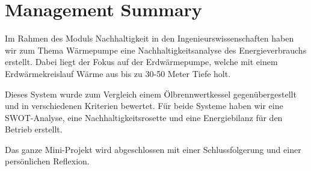 \chapter*{Management Summary}
\label{chap:managementSummary}

Im Rahmen des Moduls \glqq Nachhaltigkeit in den Ingenieurswissenschaften\grqq{} haben wir zum Thema Wärmepumpe eine Nachhaltigkeitsanalyse des Energieverbrauchs erstellt. Dabei liegt der Fokus auf der Erdwärmepumpe, welche mit einem Erdwärmekreislauf Wärme aus bis zu 30-50 Meter Tiefe holt.

Dieses System wurde zum Vergleich einem Ölbrennwertkessel gegenübergestellt und in verschiedenen Kriterien bewertet. Für beide Systeme haben wir eine SWOT-Analyse, eine Nachhaltigkeitsrosette und eine Energiebilanz für den Betrieb erstellt.

Das ganze Mini-Projekt wird abgeschlossen mit einer Schlussfolgerung und einer persönlichen Reflexion.
